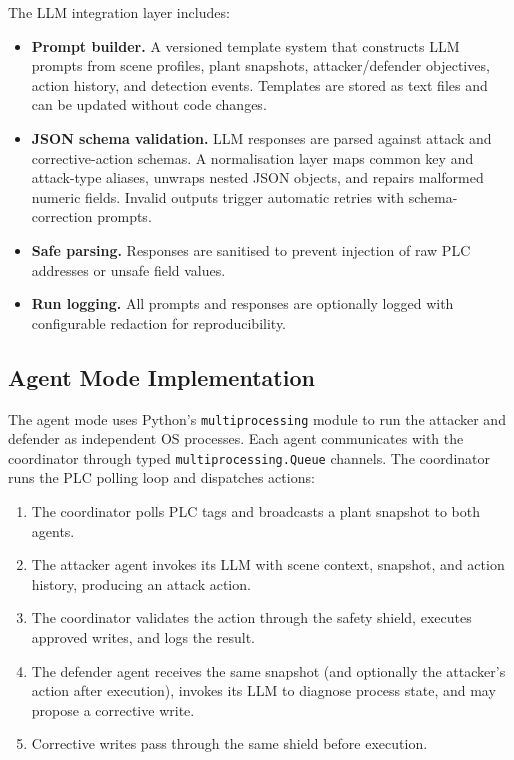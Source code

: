 The LLM integration layer includes:

\begin{itemize}[leftmargin=1.5em]
    \item \textbf{Prompt builder.} A versioned template system that constructs LLM prompts from scene profiles, plant snapshots, attacker/defender objectives, action history, and detection events. Templates are stored as text files and can be updated without code changes.
    \item \textbf{JSON schema validation.} LLM responses are parsed against attack and corrective-action schemas. A normalisation layer maps common key and attack-type aliases, unwraps nested JSON objects, and repairs malformed numeric fields. Invalid outputs trigger automatic retries with schema-correction prompts.
    \item \textbf{Safe parsing.} Responses are sanitised to prevent injection of raw PLC addresses or unsafe field values.
    \item \textbf{Run logging.} All prompts and responses are optionally logged with configurable redaction for reproducibility.
\end{itemize}

\subsection{Agent Mode Implementation}
\label{sec:impl:agent}

The agent mode uses Python's \texttt{multiprocessing} module to run the attacker and defender as independent OS processes. Each agent communicates with the coordinator through typed \texttt{multiprocessing.Queue} channels. The coordinator runs the PLC polling loop and dispatches actions:

\begin{enumerate}[leftmargin=1.5em]
    \item The coordinator polls PLC tags and broadcasts a plant snapshot to both agents.
    \item The attacker agent invokes its LLM with scene context, snapshot, and action history, producing an attack action.
    \item The coordinator validates the action through the safety shield, executes approved writes, and logs the result.
    \item The defender agent receives the same snapshot (and optionally the attacker's action after execution), invokes its LLM to diagnose process state, and may propose a corrective write.
    \item Corrective writes pass through the same shield before execution.
\end{enumerate}

